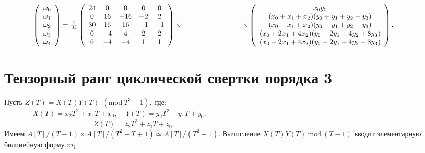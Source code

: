 \documentclass{mai_book}
\begin{document}
$\indent ~~~~~~~
\left(\begin{array}{c}
\omega_0 \\
 \omega_1 \\
\omega_2 \\
\omega_3 \\
\omega_4 \\
\end{array}\right)=\frac{1}{24}
\left(\begin{array}{ccccc}
24 & 0 & 0 & 0 & 0  \\
0 & 16 & -16 & -2 & 2  \\
30 & 16 & 16 & -1 & -1  \\
0 & -4 & 4 & 2 & 2 \\
6 & -4 & -4 & 1 & 1  \\
\end{array}\right) \times \\
\indent~~~~~~~~~~~~~~~~~~~~\times
\left(\begin{array}{c}
x_0y_0 \\
 (x_0+x_1+x_2)(y_0+y_1+y_2+y_3) \\
(x_0-x_1+x_2)(y_0-y_1+y_2-y_3)\\
(x_0+2x_1+4x_2)(y_0+2y_1+4y_2+8y_3) \\
(x_0-2x_1+4x_2)(y_0-2y_1+4y_2-8y_3) \\
\end{array}\right).\\
$
\section{Тензорный ранг циклической свертки порядка 3} 
 
\indent Пусть $Z(T)=X(T)Y(T)~~(\text{mod}~T^3-1),$ где: \\

\indent~~~~~~~~$X(T)=x_2T^2+x_1T+x_0,~~~~~Y(T)=y_2T^2+y_1T+y_0,$\\
\indent~~~~~~~~~~~~~~~~~~~~~~~~~$Z(T)=z_2T^2+z_1T+z_0.$ \\

\noindent Имеем $A[T]/(T-1)\times A[T]/(T^2+T+1)\simeq A[T]/(T^3-1).$ Вычисление\linebreak
$X(T)Y(T)~\text{mod}~(T-1)$ вводит элементарную билинейную форму $m_1=$ \linebreak
\end{document}
